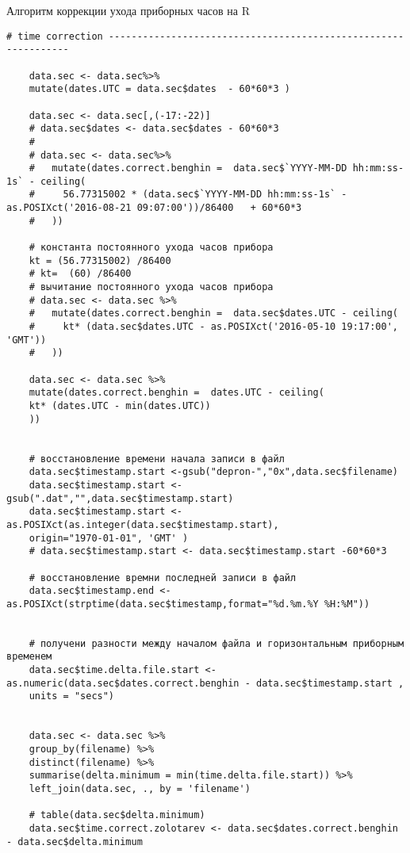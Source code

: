 \begin{ListingEnv}
	\caption{Алгоритм коррекции ухода приборных часов на R}
	\label{list:timecor}
	\begin{lstlisting}[language={Renhanced}]
	# time correction ---------------------------------------------------------------
	
	data.sec <- data.sec%>%
	mutate(dates.UTC = data.sec$dates  - 60*60*3 )
	
	data.sec <- data.sec[,(-17:-22)]
	# data.sec$dates <- data.sec$dates - 60*60*3
	# 
	# data.sec <- data.sec%>%
	#   mutate(dates.correct.benghin =  data.sec$`YYYY-MM-DD hh:mm:ss-1s` - ceiling(
	#     56.77315002 * (data.sec$`YYYY-MM-DD hh:mm:ss-1s` - as.POSIXct('2016-08-21 09:07:00'))/86400   + 60*60*3
	#   ))
	
	# константа постоянного ухода часов прибора
	kt = (56.77315002) /86400
	# kt=  (60) /86400
	# вычитание постоянного ухода часов прибора
	# data.sec <- data.sec %>%
	#   mutate(dates.correct.benghin =  data.sec$dates.UTC - ceiling(
	#     kt* (data.sec$dates.UTC - as.POSIXct('2016-05-10 19:17:00', 'GMT'))
	#   ))
	
	data.sec <- data.sec %>%
	mutate(dates.correct.benghin =  dates.UTC - ceiling(
	kt* (dates.UTC - min(dates.UTC))
	))
	
	
	# восстановление времени начала записи в файл
	data.sec$timestamp.start <-gsub("depron-","0x",data.sec$filename)
	data.sec$timestamp.start <-gsub(".dat","",data.sec$timestamp.start)
	data.sec$timestamp.start <- as.POSIXct(as.integer(data.sec$timestamp.start), 
	origin="1970-01-01", 'GMT' )
	# data.sec$timestamp.start <- data.sec$timestamp.start -60*60*3
	
	# восстановление времни последней записи в файл
	data.sec$timestamp.end <- as.POSIXct(strptime(data.sec$timestamp,format="%d.%m.%Y %H:%M"))
	
	
	# получени разности между началом файла и горизонтальным приборным временем
	data.sec$time.delta.file.start <- as.numeric(data.sec$dates.correct.benghin - data.sec$timestamp.start ,
	units = "secs") 
	
	
	data.sec <- data.sec %>%
	group_by(filename) %>%
	distinct(filename) %>%
	summarise(delta.minimum = min(time.delta.file.start)) %>%
	left_join(data.sec, ., by = 'filename')
	
	# table(data.sec$delta.minimum)
	data.sec$time.correct.zolotarev <- data.sec$dates.correct.benghin - data.sec$delta.minimum 
	

\end{lstlisting}
\end{ListingEnv}
